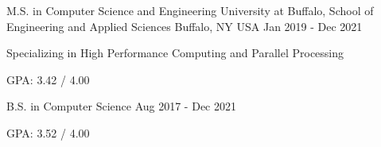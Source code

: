 

\begin{cventries}


  \cventry
    {M.S. in Computer Science and Engineering} %
    {University at Buffalo, School of Engineering and Applied Sciences} %
    {Buffalo, NY USA} %
    {Jan 2019 - Dec 2021} %
    {
      \begin{cvitems} %
        \item {Specializing in High Performance Computing and Parallel Processing}
        \item {GPA: 3.42 / 4.00}
      \end{cvitems}
    }


  \cventry
    {B.S. in Computer Science} %
    {} %
    {} %
    {Aug 2017 - Dec 2021} %
    {
      \begin{cvitems} %
        \item {GPA: 3.52 / 4.00}
      \end{cvitems}
    }

\end{cventries}
